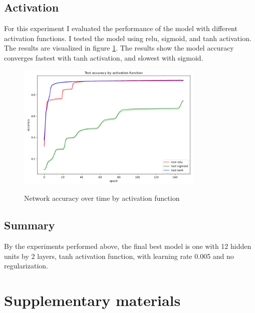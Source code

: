 \documentclass{article}
\begin{document}
\subsection{Activation}
For this experiment I evaluated the performance of the model with different activation functions. I tested the model using relu, sigmoid, and tanh activation. The results are visualized in figure \ref{fig:act}. The results show the model accuracy converges fastest with tanh activation, and slowest with sigmoid.

\begin{figure}[H]
    \centering
    \includegraphics[width=0.8\textwidth]{part2/experiments/activation/activation.png}
    \label{fig:act}
    \caption{Network accuracy over time by activation function}
\end{figure}

\subsection{Summary}

By the experiments performed above, the final best model is one with 12 hidden units by 2 layers, tanh activation function, with learning rate 0.005 and no regularization.

\section{Supplementary materials}
\end{document}
